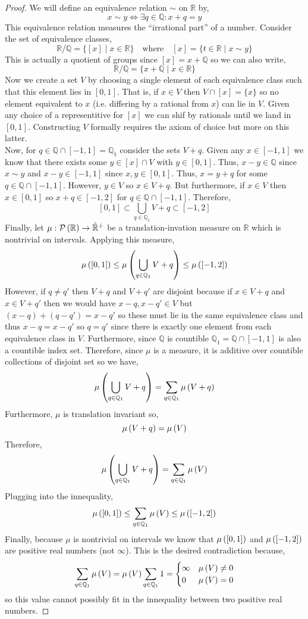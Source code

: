 \documentclass{article}
\newcommand{\Q}{\mathbb{Q}}
\newcommand{\R}{\mathbb{R}}
\theoremstyle{theorem}
\theoremstyle{definition}
\theoremstyle{definition}
\theoremstyle{remark}
\theoremstyle{definition}
\theoremstyle{remark}
\begin{document}
\begin{proof}
We will define an equivalence relation $\sim$ on $\R$ by,
\[ x \sim y \iff \exists q \in \Q : x + q = y \]
This equivalence relation measures the ``irrational part'' of a number. Consider the set of equivalence classes,
\[ \R / \Q = \{ [x] \mid x \in \R \} \quad \text{where} \quad [x] = \{t \in \R \mid x \sim y \} \]
This is actually a quotient of groups since $[x] = x + \Q$ so we can also write,
\[ \R / \Q = \{ x + \Q \mid x \in \R \} \]
Now we create a set $V$ by choosing a single element of each equivalence class such that this element lies in $[0,1]$. That is, if $x \in V$ then $V \cap [x] = \{x\}$ so no element equivalent to $x$ (i.e. differing by a rational from $x$) can lie in $V$. Given any choice of a representitive for $[x]$ we can shif by rationals until we land in $[0, 1]$. Constructing $V$ formally requires the axiom of choice but more on this latter. 
\bigskip\\
Now, for $q \in \Q \cap [-1, 1] = \Q_{1}$ consider the sets $V + q$. Given any $x \in [-1, 1]$ we know that there exists some $y \in [x] \cap V$ with $y \in [0, 1]$. Thus, $x - y \in \Q$ since $x \sim y$ and $x - y \in [-1, 1]$ since $x,y \in [0, 1]$. Thus, $x = y + q$ for some $q \in \Q \cap [-1,1]$. However, $y \in V$ so $x \in V + q$. But furthermore, if $x \in V$ then $x \in [0, 1]$ so $x + q \in [-1, 2]$ for $q \in \Q \cap [-1,1]$. Therefore,
\[ [0, 1] \subset \bigcup_{q \in \Q_{1}} V + q \subset [-1, 2] \]
Finally, let $\mu : \Power{\R} \to \Rcomp$ be a translation-invation measure on $\R$ which is nontrivial on intervals. Applying this measure,
\[ \measure{[0, 1]} \le \measure{\bigcup_{q \in \Q_{1}} V + q} \le \measure{[-1,2]} \]
However, if $q \neq q'$ then $V + q$ and $V + q'$ are disjoint because if $x \in V + q$ and $x \in V + q'$ then we would have $x - q, x - q' \in V$ but $(x - q) + (q - q') = x - q'$ so these must lie in the same equivalence class and thus $x - q = x - q'$ so $q = q'$ since there is exactly one element from each equivalence class in $V$. Furthermore, since $\Q$ is countible $\Q_1 = \Q \cap [-1,1]$ is also a countible index set. Therefore, since $\mu$ is a measure, it is additive over countible collections of disjoint set so we have,
\[ \measure{\bigcup_{q \in \Q_{1}} V + q} = \sum_{q \in \Q_{1}} \measure{V + q} \]
Furthermore, $\mu$ is translation invariant so,
\[ \mu\left( V + q \right) = \mu\left( V \right) \]
Therefore,
\[ \measure{\bigcup_{q \in \Q_{1}} V + q} = \sum_{q \in \Q_{1}} \measure{V} \]
Plugging into the innequality,
\[ \measure{[0, 1]} \le \sum_{q \in \Q_{1}} \measure{V} \le \measure{[-1,2]} \]
Finally, because $\mu$ is nontrivial on intervals we know that $\mu\left( [0,1] \right)$ and $\mu\left( [-1,2] \right)$ are positive real numbers (not $\infty$). This is the desired contradiction because,
\[ \sum_{q \in \Q_{1}} \measure{V} = \measure{V} \sum_{q \in \Q_1} 1 
= 
\begin{cases}
\infty & \measure{V} \neq 0
\\
0 & \measure{V} = 0
\end{cases}\] 
so this value cannot possibly fit in the innequality between two positive real numbers. 
\end{proof}
\end{document}
